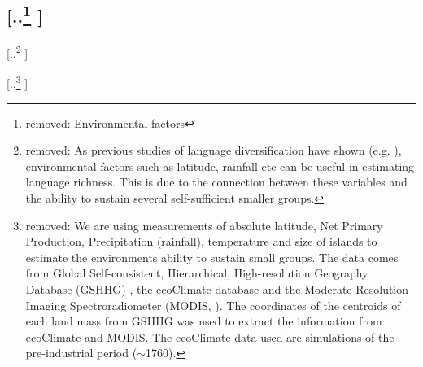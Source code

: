 \documentclass[unnumsec,webpdf,modern,medium]{oup-authoring-template}
\providecommand{\DIFdeltex}[1]{{\protect\color{red} [..\footnote{removed: #1} ]}} %
\providecommand{\DIFdelbegin}{} %
\providecommand{\DIFdel}[1]{\texorpdfstring{\DIFdeltex{#1}}{}} %
\newcommand{\DIFscaledelfig}{0.5}
\newlength{\DIFdelgraphicswidth} %
\newlength{\DIFdelgraphicsheight} %
\newcommand{\DIFdelincludegraphics}[2][]{%
\sbox{\DIFdelgraphicsbox}{\DIFOincludegraphics[#1]{#2}}%
\settoboxwidth{\DIFdelgraphicswidth}{\DIFdelgraphicsbox} %
\settoboxtotalheight{\DIFdelgraphicsheight}{\DIFdelgraphicsbox} %
\scalebox{\DIFscaledelfig}{%
\parbox[b]{\DIFdelgraphicswidth}{\usebox{\DIFdelgraphicsbox}\\[-\baselineskip] \rule{\DIFdelgraphicswidth}{0em}}\llap{\resizebox{\DIFdelgraphicswidth}{\DIFdelgraphicsheight}{%
\setlength{\unitlength}{\DIFdelgraphicswidth}%
\begin{picture}(1,1)%
\thicklines\linethickness{2pt} %
{\color[rgb]{1,0,0}\put(0,0){\framebox(1,1){}}}%
{\color[rgb]{1,0,0}\put(0,0){\line( 1,1){1}}}%
{\color[rgb]{1,0,0}\put(0,1){\line(1,-1){1}}}%
\end{picture}%
}\hspace*{3pt}}} %
} %
\DeclareRobustCommand{\DIFdelbegin}{\DIFOdelbegin \let\includegraphics\DIFdelincludegraphics} %
\begin{document}
\FloatBarrier
\DIFdelbegin \subsection{\DIFdel{Environmental factors}} 
\addtocounter{subsection}{-1}%
\DIFdel{As previous studies of language diversification have shown (e.g. \citet{ greenhill2015demographic, gavin2017process, Pacheco_Coelho_2019, hua2019ecological}), environmental factors such as latitude, rainfall etc can be useful in estimating language richness. This is due to the connection between these variables and the ability to sustain several self-sufficient smaller groups.
}%


\DIFdel{We are using measurements of absolute latitude, Net Primary Production, Precipitation (rainfall), temperature and size of islands to estimate the environments ability to sustain small groups. The data comes from Global Self-consistent, Hierarchical, High-resolution Geography Database (GSHHG) \citep{wessel1996global}, the ecoClimate database \citep{ecoclimate} and the Moderate Resolution Imaging Spectroradiometer (MODIS, \citet{running2021modis_terra, running2021modis_aqua}). The coordinates of the centroids of each land mass from GSHHG was used to extract the information from ecoClimate and MODIS. The ecoClimate data used are simulations of the pre-industrial period ($\sim$1760).
}%
\end{document}
